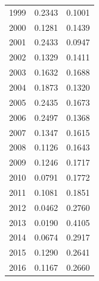 \documentclass[12pt,]{article}
\begin{document}
\begin{table}[ht]
{\begin{tabular}{rrr}
   1999 & 0.2343 & 0.1001 \\ 
   2000 & 0.1281 & 0.1439 \\ 
   2001 & 0.2433 & 0.0947 \\ 
   2002 & 0.1329 & 0.1411 \\ 
   2003 & 0.1632 & 0.1688 \\ 
   2004 & 0.1873 & 0.1320 \\ 
   2005 & 0.2435 & 0.1673 \\ 
   2006 & 0.2497 & 0.1368 \\ 
   2007 & 0.1347 & 0.1615 \\ 
   2008 & 0.1126 & 0.1643 \\ 
   2009 & 0.1246 & 0.1717 \\ 
   2010 & 0.0791 & 0.1772 \\ 
   2011 & 0.1081 & 0.1851 \\ 
   2012 & 0.0462 & 0.2760 \\ 
   2013 & 0.0190 & 0.4105 \\ 
   2014 & 0.0674 & 0.2917 \\ 
   2015 & 0.1290 & 0.2641 \\ 
   2016 & 0.1167 & 0.2660 \\ 
   \hline
\end{tabular}
}
\end{table}

\FloatBarrier
\end{document}
